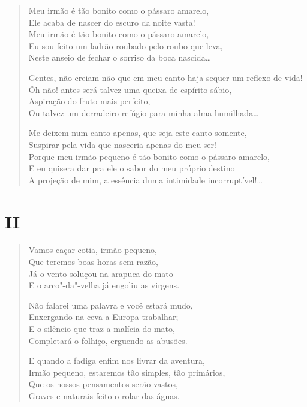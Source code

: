 {\begin{verse}
Meu irmão é tão bonito como o pássaro amarelo,\\
Ele acaba de nascer do escuro da noite vasta!\\
Meu irmão é tão bonito como o pássaro amarelo,\\
Eu sou feito um ladrão roubado pelo roubo que leva,\\
Neste anseio de fechar o sorriso da boca nascida\ldots{}

Gentes, não creiam não que em meu canto haja sequer um reflexo de vida!\\
Ôh não! antes será talvez uma queixa de espírito sábio,\\
Aspiração do fruto mais perfeito,\\
Ou talvez um derradeiro refúgio para minha alma humilhada\ldots{}

Me deixem num canto apenas, que seja este canto somente,\\
Suspirar pela vida que nasceria apenas do meu ser!\\
Porque meu irmão pequeno é tão bonito como o pássaro amarelo,\\
E eu quisera dar pra ele o sabor do meu próprio destino\\
A projeção de mim, a essência duma intimidade incorruptível!\ldots{}
\end{verse}

\medskip
\section*{II}

\begin{verse}
Vamos caçar cotia, irmão pequeno,\\
Que teremos boas horas sem razão,\\
Já o vento soluçou na arapuca do mato\\
E o arco"-da"-velha já engoliu as virgens.

Não falarei uma palavra e você estará mudo,\\
Enxergando na ceva a Europa trabalhar;\\
E o silêncio que traz a malícia do mato,\\
Completará o folhiço, erguendo as abusões.

E quando a fadiga enfim nos livrar da aventura,\\
Irmão pequeno, estaremos tão simples, tão primários,\\
Que os nossos pensamentos serão vastos,\\
Graves e naturais feito o rolar das águas.
\end{verse}

}
